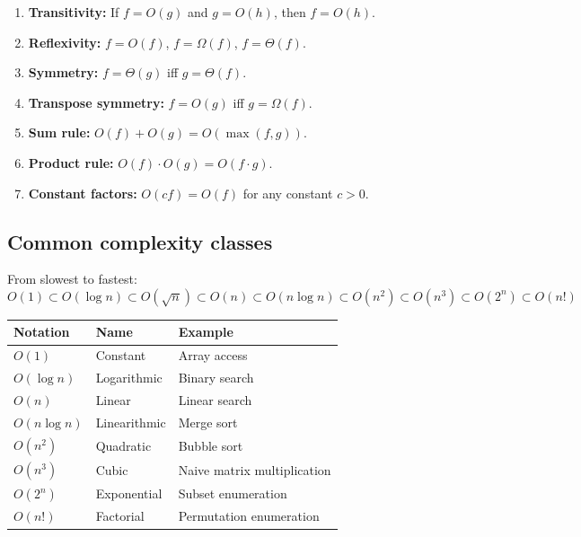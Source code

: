 \begin{theorem}
\begin{enumerate}
  \item \textbf{Transitivity:} If $f = O(g)$ and $g = O(h)$, then $f = O(h)$.
  \item \textbf{Reflexivity:} $f = O(f)$, $f = \Omega(f)$, $f = \Theta(f)$.
  \item \textbf{Symmetry:} $f = \Theta(g)$ iff $g = \Theta(f)$.
  \item \textbf{Transpose symmetry:} $f = O(g)$ iff $g = \Omega(f)$.
  \item \textbf{Sum rule:} $O(f) + O(g) = O(\max(f, g))$.
  \item \textbf{Product rule:} $O(f) \cdot O(g) = O(f \cdot g)$.
  \item \textbf{Constant factors:} $O(cf) = O(f)$ for any constant $c > 0$.
\end{enumerate}
\end{theorem}

\subsection*{Common complexity classes}

\begin{definition}
From slowest to fastest:
\[
O(1) \subset O(\log n) \subset O(\sqrt{n}) \subset O(n) \subset O(n \log n) \subset O(n^2) \subset O(n^3) \subset O(2^n) \subset O(n!)
\]
\end{definition}

\begin{center}
\begin{tabular}{lll}
\textbf{Notation} & \textbf{Name} & \textbf{Example} \\
\hline
$O(1)$ & Constant & Array access \\
$O(\log n)$ & Logarithmic & Binary search \\
$O(n)$ & Linear & Linear search \\
$O(n \log n)$ & Linearithmic & Merge sort \\
$O(n^2)$ & Quadratic & Bubble sort \\
$O(n^3)$ & Cubic & Naive matrix multiplication \\
$O(2^n)$ & Exponential & Subset enumeration \\
$O(n!)$ & Factorial & Permutation enumeration
\end{tabular}
\end{center}

